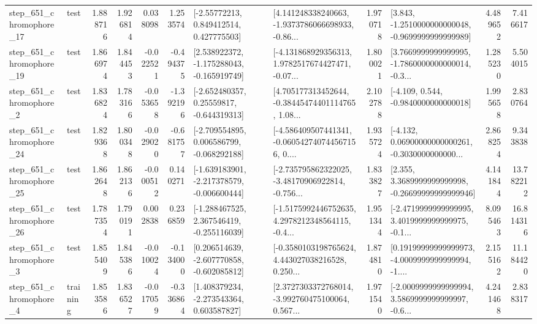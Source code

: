 \begin{tabular}{llrrrrllrlrr}
  step\_651\_chromophore\_17 &      test &      1.888716 &    1.926814 &      0.038098 &  1.253574 &     [-2.55772213, 0.849412514, 0.427775503] &  [4.141248338240663, -1.9373786066698933, -0.86... &       1.970718 &  [3.843, -1.2510000000000048, -0.9699999999999989] &            4.489652 &          7.416617 \\
  step\_651\_chromophore\_19 &      test &      1.866974 &    1.844453 &     -0.022521 & -0.494375 &   [2.538922372, -1.175288043, -0.165919749] &  [-4.131868929356313, 1.9782517674427471, -0.07... &       1.800021 &  [3.7669999999999995, -1.7860000000000014, -0.3... &            1.285230 &          5.504015 \\
   step\_651\_chromophore\_2 &      test &      1.836824 &    1.783166 &     -0.053658 & -1.392196 &    [-2.652480357, 0.25559817, -0.644319313] &  [4.705177313452644, -0.38445474401114765, 1.08... &       2.102788 &               [-4.109, 0.544, -0.9840000000000018] &            1.995658 &          2.830764 \\
  step\_651\_chromophore\_24 &      test &      1.829368 &    1.800348 &     -0.029020 & -0.681757 &   [-2.709554895, 0.006586799, -0.068292188] &  [-4.586409507441341, -0.060542740744567156, 0.... &       1.935724 &  [-4.132, 0.06900000000000261, -0.3030000000000... &            2.868254 &          9.343838 \\
  step\_651\_chromophore\_25 &      test &      1.862648 &    1.862136 &     -0.000512 &  0.140271 &  [-1.639183901, -2.217378579, -0.006600444] &  [-2.735795862322025, -3.48170906922814, -0.756... &       1.833827 &  [2.355, 3.3689999999999998, -0.26699999999999946] &            4.141844 &         13.782212 \\
  step\_651\_chromophore\_26 &      test &      1.787354 &    1.790191 &      0.002838 &  0.236859 &   [-1.288467525, 2.367546419, -0.255116039] &  [-1.5175992446752635, 4.2978212348564115, -0.4... &       1.951344 &  [-2.4719999999999995, 3.4019999999999975, -0.1... &            8.095463 &         16.814316 \\
   step\_651\_chromophore\_3 &      test &      1.855409 &    1.845386 &     -0.010024 & -0.134000 &   [0.206514639, -2.607770858, -0.602085812] &  [-0.3580103198765624, 4.443027038216528, 0.250... &       1.874810 &  [0.19199999999999973, -4.0009999999999994, -1.... &            2.155162 &         11.184420 \\
   step\_651\_chromophore\_4 &  training &      1.853586 &    1.836527 &     -0.017059 & -0.336864 &    [1.408379234, -2.273543364, 0.603587827] &  [2.3727303372768014, -3.992760475100064, 0.567... &       1.971540 &  [-2.0009999999999994, 3.5869999999999997, -0.6... &            4.241468 &          2.838317 \\

\end{tabular}
